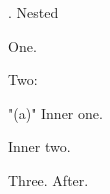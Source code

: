 
\document
{}. Nested\endhead
\roster
\item One.
\item Two:
  \roster
  \item"(a)" Inner one.
  \item Inner two.
  \endroster
\item Three.
\endroster
After.
\enddocument
